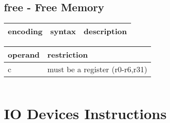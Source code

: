 \documentclass[letterpaper,10pt,openright,twoside,onecolumn]{book}
\begin{document}
\newpage\subsection{free - Free Memory}
  \begin{tabular}{|l|l|l|}
   \hline
    encoding & syntax & description \\
   \hline
   \hline
  \end{tabular}
  \flushleft
  \begin{tabular}{|l|l|}
   \hline
    operand & restriction \\
   \hline
    c & must be a register (r0-r6,r31) \\
   \hline
  \end{tabular}
  \begin{verbatim}
  \end{verbatim}

\clearpage\section{IO Devices Instructions}
\end{document}
